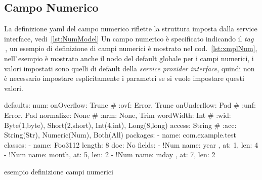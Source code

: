 \documentclass[a4paper,10pt]{report}
\newif\ifesource
\newenvironment{elisting}[1][H]
  {\captionsetup{aboveskip=0pt}\begin{listing}[#1]}
  {\end{listing}%
}
\begin{document}
\subsection{Campo Numerico} \label{sub:yaml.num}
La definizione yaml del campo numerico riflette la struttura imposta dalla
service interface, vedi~\ref{lst:NumModel}
Un campo numerico è specificato indicando il \textsl{tag} 
\,, 
un esempio di definizione di campi numerici è mostrato nel 
cod.~\ref{lst:xmplNum}, nell'\,esempio è mostrato anche il nodo del default
globale per i campi numerici, i valori impostati sono quelli di default
della \textsl{service provider interface}, quindi non è necessario impostare
esplicitamente i parametri se si vuole impostare questi valori.

\ifesource
\begin{figure*}[!htb]
\begin{lstlisting}[language=yaml, caption={esempio definizione campi numerici}, 
label=lst:xmplNum]
defaults:
  num:
    onOverflow: Trunc   # :ovf: Error, Trunc
    onUnderflow: Pad    # :unf: Error, Pad
    normalize: None     # :nrm: None, Trim
    wordWidth: Int      # :wid: Byte(1,byte), Short(2,short), Int(4,int), Long(8,long)
    access: String      # :acc: String(Str), Numeric(Num), Both(All)
packages:
  - name: com.example.test
    classes:
      - name: Foo3112
        length: 8
        doc: No
        fields:
          - !Num { name: year , at: 1, len: 4 }
          - !Num { name: month, at: 5, len: 2 }
          - !Num { name: mday , at: 7, len: 2 }
\end{lstlisting}
\end{figure*}
\else
\begin{elisting}[!htb]
\begin{yamlcode}
defaults:
  num:
    onOverflow: Trunc   # :ovf: Error, Trunc
    onUnderflow: Pad    # :unf: Error, Pad
    normalize: None     # :nrm: None, Trim
    wordWidth: Int      # :wid: Byte(1,byte), Short(2,short), Int(4,int), Long(8,long)
    access: String      # :acc: String(Str), Numeric(Num), Both(All)
packages:
  - name: com.example.test
    classes:
      - name: Foo3112
        length: 8
        doc: No
        fields:
          - !Num { name: year , at: 1, len: 4 }
          - !Num { name: month, at: 5, len: 2 }
          - !Num { name: mday , at: 7, len: 2 }
\end{yamlcode}
\caption{esempio definizione campi numerici}
\label{lst:xmplNum}
\end{elisting}
\fi
\end{document}
